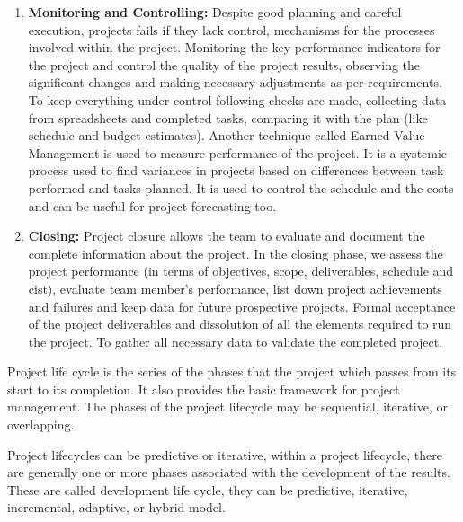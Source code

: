 \begin{enumerate}
    \item \textbf{Monitoring and Controlling:} Despite good planning and careful execution, projects fails if they lack control, mechanisms for the processes involved within the project. Monitoring the key performance indicators for the project and control the quality of the project results, observing the significant changes and making necessary adjustments as per requirements. To keep everything under control following checks are made, collecting data from spreadsheets and completed tasks, comparing it with the plan (like schedule and budget estimates). Another technique called Earned Value Management is used to measure performance of the project. It is a systemic process used to find variances in projects based on differences between task performed and tasks planned. It is used to control the schedule and the costs and can be useful for project forecasting too.

    \item \textbf{Closing:} Project closure allows the team to evaluate and document the complete information about the project. In the closing phase, we assess the project performance (in terms of objectives, scope, deliverables, schedule and cist), evaluate team member’s performance, list down project achievements and failures and keep data for future prospective projects. Formal acceptance of the project deliverables and dissolution of all the elements required to run the project. To gather all necessary data to validate the completed project. 

\end{enumerate}


Project life cycle is the series of the phases that the project which passes from its start to its completion. It also provides the basic framework for project management. The phases of the project lifecycle may be sequential, iterative, or overlapping.

Project lifecycles can be predictive or iterative, within a project lifecycle, there are generally one or more phases associated with the development of the results. These are called development life cycle, they can be predictive, iterative, incremental, adaptive, or hybrid model.

